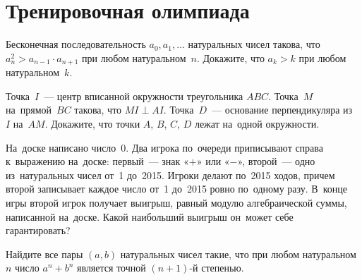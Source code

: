 
\section*{Тренировочная олимпиада}


\begin{problems}

\item
Бесконечная последовательность $a_0, a_1, \ldots$ натуральных чисел такова, что
\(
    a_{n}^2 > a_{n-1} \cdot a_{n+1}
\)
при любом натуральном~$n$.
Докажите, что $a_k > k$ при любом натуральном~$k$.

\item
Точка~$I$~— центр вписанной окружности треугольника $ABC$.
Точка~$M$ на~прямой~$BC$ такова, что $MI \perp AI$.
Точка~$D$~— основание перпендикуляра из~$I$ на~$AM$.
Докажите, что точки $A$, $B$, $C$, $D$ лежат на~одной окружности.

\item
На~доске написано число~0.
Два игрока по~очереди приписывают справа к~выражению на~доске:
первый~— знак «$+$» или «$-$», второй~— одно из~натуральных чисел
от~1 до~2015.
Игроки делают по~2015 ходов, причем второй записывает каждое число от~1 до~2015
ровно по~одному разу.
В~конце игры второй игрок получает выигрыш, равный модулю алгебраической суммы,
написанной на~доске.
Какой наибольший выигрыш он~может себе гарантировать?

\item
Найдите все пары $(a, b)$ натуральных чисел такие, что при любом
натуральном~$n$ число $a^n + b^n$ является точной $(n + 1)$-й степенью.

\end{problems}

